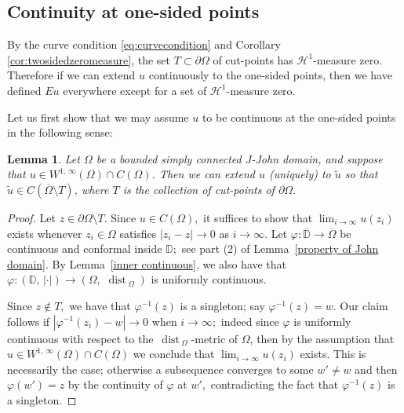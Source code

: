\documentclass[reqno,11pt]{amsart}
\makeatletter
\def\ch{{\mathcal H}}
\def\dist{{\mathop\mathrm{\,dist\,}}}
\def\wz{\widetilde}
\newtheorem{lem}[thm]{Lemma}%
\numberwithin{equation}{section}
\theoremstyle{remark}
\makeatother
\begin{document}
\subsection{Continuity at one-sided points}

By the curve condition  \eqref{eq:curvecondition}  and Corollary \ref{cor:twosidedzeromeasure}, 
the set $T \subset \partial\Omega$ of cut-points  
has $\ch^1$-measure zero. Therefore if we can extend $u$ continuously to the 
one-sided points, then we have defined $Eu$ everywhere except for a set of 
$\ch^1$-measure zero. 

Let us first show that we may assume $u$ to be continuous at the one-sided points in the following sense:

\begin{lem}\label{continuous extension}
Let $\Omega$ be a bounded simply connected $J$-John domain, 
and suppose that
$u\in W^{1,\,\infty}(\Omega)\cap C(\Omega)$. Then we can extend $u$ (uniquely) to $
\wz u$ so that 
$\wz u\in C(\overline{\Omega}\setminus T)$, 
where $T$ is the collection of cut-points of  $\partial \Omega.$
\end{lem}

\begin{proof}
Let $z\in \partial{\Omega}\setminus T.$ 
Since 
$u\in   C(\Omega),$ it suffices to show that $\lim_{i\to \infty} u(z_i)$ exists   whenever $z_i\in \Omega$ satisfies $|z_i -z |\to 0$ as $i\to \infty.$ Let 
$\varphi\colon \overline{\mathbb D}\to \overline{\Omega}$ be continuous 
and conformal inside $\mathbb D;$ see part (2) of Lemma~\ref{property of John domain}. 
By Lemma~\ref{inner continuous}, we also have that $\varphi\colon (\mathbb D,\,|\cdot|)\to (\Omega,\,\dist_{\Omega})$ is uniformly continuous.


Since $z\notin T,$ we have that 
$\varphi^{-1}(z)$ is a singleton; say $\varphi^{-1}(z)=w.$
Our claim follows if $|\varphi^{-1}(z_i)-w|\to 0$ when $i\to \infty;$ indeed since $\varphi$ is uniformly continuous with respect to the $\dist_{\Omega}$-metric of $\Omega$, then by the assumption that $u\in W^{1,\,\infty}(\Omega)\cap C(\Omega)$ we conclude that $\lim_{i\to \infty} u(z_i)$ exists. 
This is 
necessarily the case; otherwise a subsequence converges to some $w'\neq w$
and then $\varphi(w')=z$ by the continuity of $\varphi$ at $w',$
contradicting the fact that $\varphi^{-1}(z)$ is a singleton.  
\end{proof}
\end{document}
